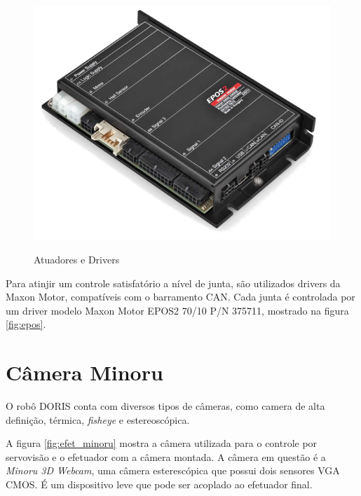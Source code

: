 \begin{figure}[htp]
{  \includegraphics[height=\twosubht]{./img/epos2-70-10.png}%
}
\caption{Atuadores e Drivers}
\end{figure}


Para atinjir um controle satisfatório a nível de junta, são utilizados drivers da Maxon Motor, compatíveis com o barramento CAN. Cada junta é controlada por um driver modelo Maxon Motor EPOS2 70/10 P/N 375711, mostrado na figura \ref{fig:epos}.

\section{Câmera Minoru} \label{sec:minoru}

O robô DORIS conta com diversos tipos de câmeras, como camera de alta definição, térmica, \textit{fisheye} e estereoscópica. 

A figura \ref{fig:efet_minoru} mostra a câmera utilizada para o controle por servovisão e o efetuador com a câmera montada.
A câmera em questão é a \textit{Minoru 3D Webcam}, uma câmera esterescópica que possui dois sensores VGA CMOS. É um dispositivo leve que pode ser acoplado ao efetuador final.


